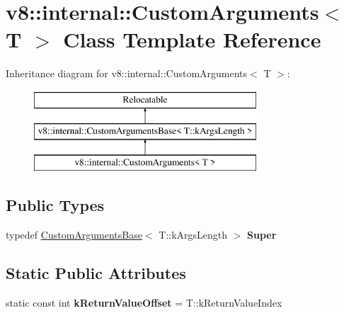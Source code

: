 \hypertarget{classv8_1_1internal_1_1_custom_arguments}{}\section{v8\+:\+:internal\+:\+:Custom\+Arguments$<$ T $>$ Class Template Reference}
\label{classv8_1_1internal_1_1_custom_arguments}
Inheritance diagram for v8\+:\+:internal\+:\+:Custom\+Arguments$<$ T $>$\+:\begin{figure}[H]
\begin{center}
\leavevmode
\includegraphics[height=3.000000cm]{classv8_1_1internal_1_1_custom_arguments}
\end{center}
\end{figure}
\subsection*{Public Types}
\begin{DoxyCompactItemize}
\item 
\hypertarget{classv8_1_1internal_1_1_custom_arguments_a7f75869df8dba5698105acfe6dd1b39c}{}typedef \hyperlink{classv8_1_1internal_1_1_custom_arguments_base}{Custom\+Arguments\+Base}$<$ T\+::k\+Args\+Length $>$ {\bfseries Super}\label{classv8_1_1internal_1_1_custom_arguments_a7f75869df8dba5698105acfe6dd1b39c}

\end{DoxyCompactItemize}
\subsection*{Static Public Attributes}
\begin{DoxyCompactItemize}
\item 
\hypertarget{classv8_1_1internal_1_1_custom_arguments_a4665e0b15cda8ed07911cbb4a000f5cc}{}static const int {\bfseries k\+Return\+Value\+Offset} = T\+::k\+Return\+Value\+Index\label{classv8_1_1internal_1_1_custom_arguments_a4665e0b15cda8ed07911cbb4a000f5cc}

\end{DoxyCompactItemize}
